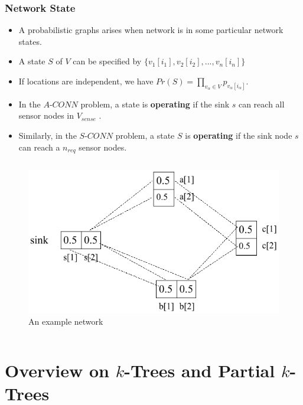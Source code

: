 \documentclass{beamer}
\begin{document}
\begin{frame}
\frametitle{Network State}
\begin{itemize}
\item A probabilistic graphs arises when network is in some particular network states.
\item A state $S$ of $V$ can be specified by $\{v_1[i_1], v_2[i_2], . . . , v_n[i_n]\}$
\item If locations are independent, we have $Pr(S) =\prod_{v_{\alpha}\in V} p_{v_\alpha[i_\alpha]}$.

\item In the $A$-$CONN$ problem, a state is \textbf{operating} if the
sink $s$ can reach all sensor nodes in $V_{sense}$ . 
\item Similarly, in the $S$-$CONN$ problem, a state $S$ is \textbf{operating} if the sink node $s$ can reach a $n_{req}$ sensor
nodes.
\end{itemize}
\vspace*{-0.5 cm}
\begin{columns}
\vspace*{-0.5 cm}

\begin{figure}[h]
\centering
\includegraphics[width=1.8 in, height=1 in]{Figure1.pdf}
\vspace*{-0.5 cm}
 \caption{ An example network}
\end{figure}
\end{columns}
\end{frame}
\section{Overview on $k$-Trees and Partial $k$-Trees}
\end{document}
